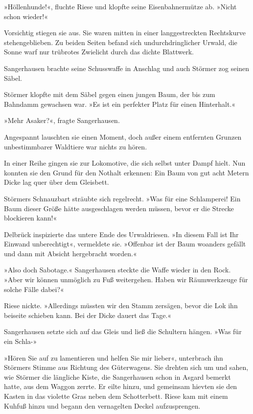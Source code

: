 »Höllenhunde!«, fluchte Riese und klopfte seine Eisenbahnermütze
ab. »Nicht schon wieder!«

Vorsichtig stiegen sie aus. Sie waren mitten in einer
langgestreckten Rechtskurve stehengeblieben. Zu beiden Seiten
befand sich undurchdringlicher Urwald, die Sonne warf nur trübrotes
Zwielicht durch das dichte Blattwerk.

Sangerhausen brachte seine Schusswaffe in Anschlag und auch Störmer
zog seinen Säbel.

Störmer klopfte mit dem Säbel gegen einen jungen Baum, der bis zum
Bahndamm gewachsen war. »Es ist ein perfekter Platz für einen
Hinterhalt.«

»Mehr Asaker?«, fragte Sangerhausen.

Angespannt lauschten sie einen Moment, doch außer einem entfernten
Grunzen unbestimmbarer Waldtiere war nichts zu hören.

In einer Reihe gingen sie zur Lokomotive, die sich selbst unter
Dampf hielt. Nun konnten sie den Grund für den Nothalt erkennen:
Ein Baum von gut acht Metern Dicke lag quer über dem Gleisbett.

Störmers Schnauzbart sträubte sich regelrecht. »Was für eine
Schlamperei! Ein Baum dieser Größe hätte ausgeschlagen werden
müssen, bevor er die Strecke blockieren kann!«

Delbrück inspizierte das untere Ende des Urwaldriesen. »In diesem
Fall ist Ihr Einwand unberechtigt«, vermeldete sie. »Offenbar ist
der Baum woanders gefällt und dann mit Absicht hergebracht
worden.«

»Also doch Sabotage.« Sangerhausen steckte die Waffe wieder in den
Rock. »Aber wir können unmöglich zu Fuß weitergehen. Haben wir
Räumwerkzeuge für solche Fälle dabei?«

Riese nickte. »Allerdings müssten wir den Stamm zersägen, bevor die
Lok ihn beiseite schieben kann. Bei der Dicke dauert das Tage.«

Sangerhausen setzte sich auf das Gleis und ließ die Schultern
hängen. »Was für ein Schla-»

»Hören Sie auf zu lamentieren und helfen Sie mir lieber«,
unterbrach ihn Störmers Stimme aus Richtung des Güterwagens. Sie
drehten sich um und sahen, wie Störmer die längliche Kiste, die
Sangerhausen schon in Asgard bemerkt hatte, aus dem Waggon zerrte.
Er eilte hinzu, und gemeinsam hievten sie den Kasten in das
violette Gras neben dem Schotterbett. Riese kam mit einem Kuhfuß
hinzu und begann den vernagelten Deckel aufzusprengen.

